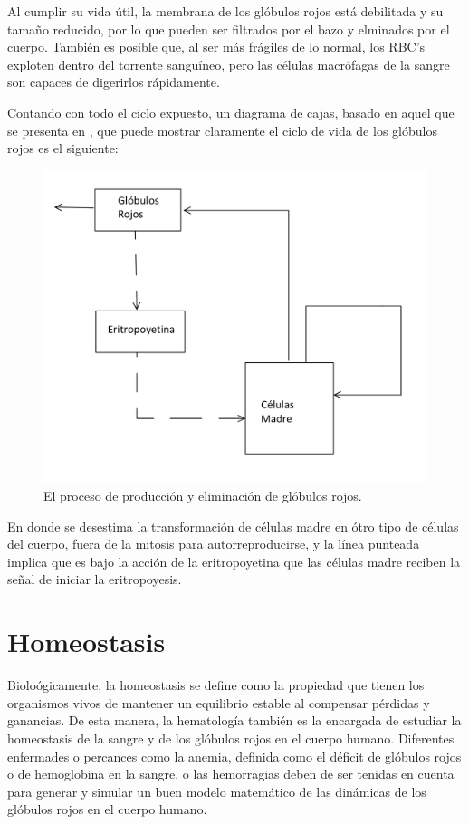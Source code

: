 Al cumplir su vida útil, la membrana de los glóbulos rojos está debilitada y su tamaño reducido, por lo que pueden ser filtrados por el bazo y elminados por el cuerpo. También es posible que, al ser más frágiles de lo normal, los RBC's exploten dentro del torrente sanguíneo, pero las células macrófagas de la sangre son capaces de digerirlos rápidamente.

Contando con todo el ciclo expuesto, un diagrama de cajas, basado en aquel que se presenta en \cite{kirk1968mathematical}, que puede mostrar claramente el ciclo de vida de los glóbulos rojos es el siguiente:
\begin{figure}[H]
    \centering
    \includegraphics[scale=0.3]{figures/VidaRBC.jpeg}
    \caption{El proceso de producción y eliminación de glóbulos rojos.}
    \label{sec:RBC:fig:VidaRBC}
\end{figure}

En donde se desestima la transformación de células madre en ótro tipo de células del cuerpo, fuera de la mitosis para autorreproducirse, y la línea punteada implica que es bajo la acción de la eritropoyetina que las células madre reciben la señal de iniciar la eritropoyesis.

\section{Homeostasis}\label{sec:RBC:homeostasis}

Bioloógicamente, la homeostasis se define como la propiedad que tienen los organismos vivos de mantener un equilibrio estable al compensar pérdidas y ganancias. De esta manera, la hematología también es la encargada de estudiar la homeostasis de la sangre y de los glóbulos rojos en el cuerpo humano. Diferentes enfermades o percances como la anemia, definida como el déficit de glóbulos rojos o de hemoglobina en la sangre, o las hemorragias deben de ser tenidas en cuenta para generar y simular un buen modelo matemático de las dinámicas de los glóbulos rojos en el cuerpo humano.
